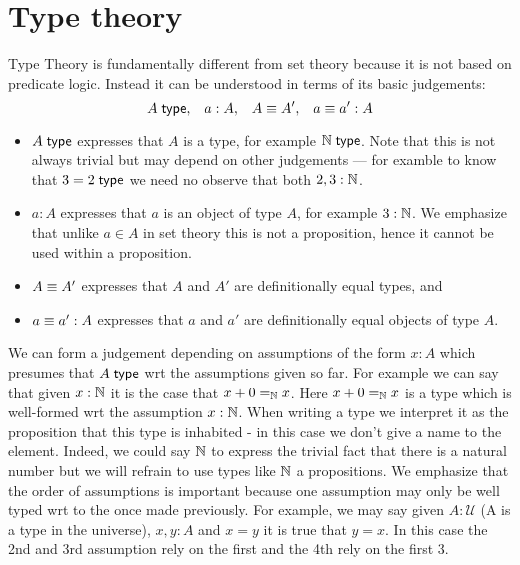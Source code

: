 \newcommand{\stype}{{\;\sf type}}
\newcommand{\rec}{{\sf rec}}
\newcommand{\bool}{{\bf B}}
\newcommand{\app}{{\sf app}}
\newcommand{\pair}{{\sf pair}}
\newcommand{\inleft}{{\sf inleft}}
\newcommand{\inright}{{\sf inright}}
\newcommand{\emptyt}{{\bf 0}}
\newcommand{\unitt}{{\bf 1}}
\newcommand{\UU}{{\mathcal U}}

\chapter{Type theory}
\label{cha:typetheory}

Type Theory is fundamentally different from set theory because it is
not based on predicate logic. Instead it can be understood in terms of
its basic judgements:
\[ A\stype,\;\;\; a:A,\;\;\; A\jdeq A',\;\;\; a\jdeq a':A\]
\begin{itemize}
\item $A\stype$ expresses that $A$ is a type, for example $\Nat
  \stype$. Note that this is not always trivial but may depend on
  other judgements --- for examble to know 
that $3 = 2 \stype$ we need no observe that both $2,3 : \mathbb{N}$.
\item $a:A$ expresses that $a$ is an object of type $A$, for example 
$3 : \mathbb{N}$.  We emphasize
  that unlike $a \in A$ in set theory this is not a proposition, hence
  it cannot be used within a proposition. 
\item $A\equiv A'$ expresses that $A$ and $A'$ are definitionally equal types, and
\item $a\equiv a':A$ expresses that $a$ and $a'$ are definitionally equal objects of type $A$.
\end{itemize}
We can form a judgement depending on  assumptions of the form $x : A$ which
presumes that $A \stype$ wrt the assumptions given so far. For
example we can say that given $x : \mathbb{N}$ it is the case that $x + 0 =_\mathbb{N}
x$. Here $x + 0 =_\mathbb{N} x$ is a type which is well-formed wrt the assumption
$x : \mathbb{N}$. When writing a type we interpret it as the proposition
that this type is inhabited - in this case we don't give a name to the
element. Indeed, we could say $\mathbb{N}$ to express the trivial fact that
there is a natural number but we will refrain to use types like $\mathbb{N}$
a propositions. We emphasize that the order of assumptions is
important because one assumption may only be well typed wrt to the
once made previously. For example, we may say given $A : \UU$ (A is a
type in the universe), $x, y : A$ and $x = y$ it is true that $y = x$.
In this case the 2nd and 3rd assumption rely on the first and the 4th
rely on the first 3. 

